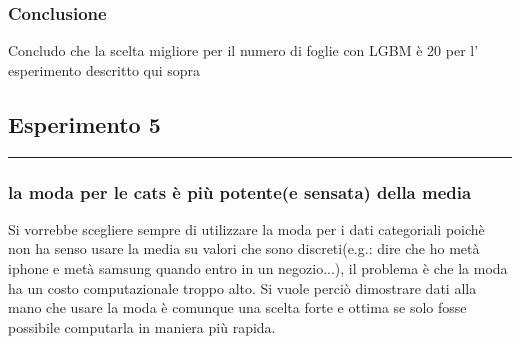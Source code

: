 \documentclass[11pt]{article}
\begin{document}
    \subsubsection{Conclusione}\label{conclusione}

Concludo che la scelta migliore per il numero di foglie con LGBM è 20
per l' esperimento descritto qui sopra

    \subsection{Esperimento 5}\label{esperimento-5}

\begin{center}\rule{0.5\linewidth}{\linethickness}\end{center}

\subsubsection{la moda per le cats è più potente(e sensata) della
media}\label{la-moda-per-le-cats-uxe8-piuxf9-potentee-sensata-della-media}

Si vorrebbe scegliere sempre di utilizzare la moda per i dati
categoriali poichè non ha senso usare la media su valori che sono
discreti(e.g.: dire che ho metà iphone e metà samsung quando entro in un
negozio...), il problema è che la moda ha un costo computazionale troppo
alto. Si vuole perciò dimostrare dati alla mano che usare la moda è
comunque una scelta forte e ottima se solo fosse possibile computarla in
maniera più rapida.
\end{document}
